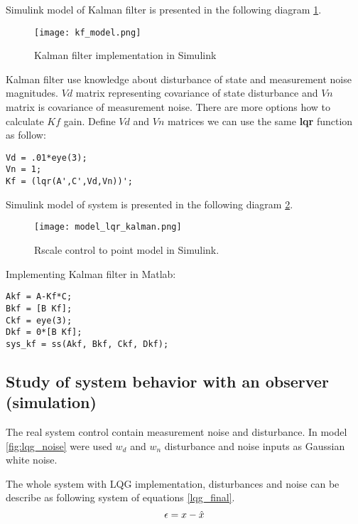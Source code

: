 \documentclass[../report.tex]{subfiles}
\begin{document}
Simulink model of Kalman filter is presented in the following diagram
\ref{fig:kf_model}.

\begin{figure}[hbt!]
    \centering
    \texttt{[image: kf\_model.png]}
    \caption{Kalman filter implementation in Simulink}
    \label{fig:kf_model}
\end{figure}

Kalman filter use knowledge  about disturbance of state and measurement
noise magnitudes. $Vd$ matrix representing covariance of state disturbance
and $Vn$ matrix is covariance of measurement noise.
There are more options how to calculate $Kf$ gain. Define $Vd$
and $Vn$ matrices we can use the same \textbf{lqr} function as follow: 

\begin{lstlisting}[frame=single]
Vd = .01*eye(3); 
Vn = 1;
Kf = (lqr(A',C',Vd,Vn))';
\end{lstlisting}

Simulink model of system is presented in the following diagram
\ref{fig:lqg}.

\begin{figure}[hbt!]
    \centering
    \texttt{[image: model\_lqr\_kalman.png]}
    \caption{Rscale control to point model in Simulink.}
    \label{fig:lqg}
\end{figure}

Implementing Kalman filter in Matlab:
\begin{lstlisting}[frame=single]
Akf = A-Kf*C;
Bkf = [B Kf];
Ckf = eye(3);
Dkf = 0*[B Kf];
sys_kf = ss(Akf, Bkf, Ckf, Dkf);
\end{lstlisting}

\subsection{Study of system behavior with an observer (simulation)}
The real system control contain measurement noise and disturbance. In model
\ref{fig:lqg_noise} were used $w_d$ and $w_n$ disturbance and noise inputs
as Gaussian white noise.


The whole system with LQG implementation, disturbances and noise can be
describe as following system of equations \ref{lqg_final}.
\begin{equation}
        \epsilon = x - \hat{x} \\
\end{equation}
\end{document}
